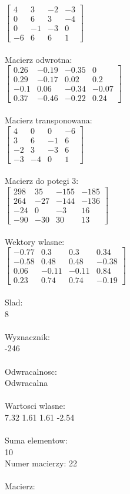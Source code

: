 \documentclass[a4paper,12pt]{article}
\begin{document}
$\begin{bmatrix} 4&3&-2&-3\\0&6&3&-4\\0&-1&-3&0\\-6&6&6&1 \end{bmatrix}$
\\
\\
Macierz odwrotna:\\

$\begin{bmatrix} 0.26&-0.19&-0.35&0\\0.29&-0.17&0.02&0.2\\-0.1&0.06&-0.34&-0.07\\0.37&-0.46&-0.22&0.24 \end{bmatrix}$
\\
\\
Macierz transponowana:\\

$\begin{bmatrix} 4&0&0&-6\\3&6&-1&6\\-2&3&-3&6\\-3&-4&0&1 \end{bmatrix}$
\\
\\
Macierz do potegi 3:\\

$\begin{bmatrix} 298&35&-155&-185\\264&-27&-144&-136\\-24&0&-3&16\\-90&-30&30&13 \end{bmatrix}$
\\
\\
Wektory wlasne:\\

$\begin{bmatrix} -0.77&0.3&0.3&0.34\\-0.58&0.48&0.48&-0.38\\0.06&-0.11&-0.11&0.84\\0.23&0.74&0.74&-0.19 \end{bmatrix}$
\\
\\
Slad:\\
8
\\
\\
Wyznacznik:\\
-246
\\
\\
Odwracalnosc:\\
Odwracalna
\\
\\
Wartosci wlasne:\\
7.32 1.61 1.61 -2.54
\\
\\
Suma elementow:\\
10
\\
\newpage
Numer macierzy:
22
\\
\\
Macierz:\\
\end{document}
